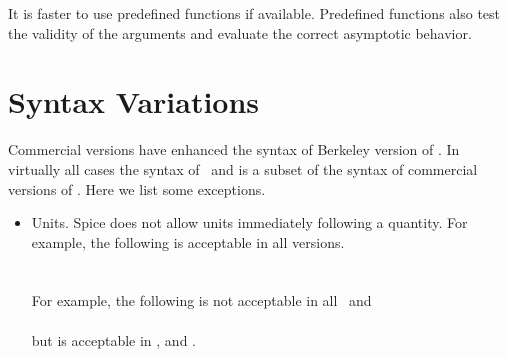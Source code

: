 It is faster to use predefined functions if available. Predefined
functions also test the validity of the arguments and evaluate the correct
asymptotic behavior.

\section{Syntax Variations}
Commercial versions have enhanced the syntax of Berkeley version of
\justspice .  In virtually all cases the syntax of \spicetwo\ and
\spicethree is a subset of the syntax of commercial versions of \justspice .
Here we list some exceptions.
\begin{itemize}
\item Units.  Spice does not allow units immediately following a quantity.
      For example, the following is acceptable in all versions.\\
      \\
      \\
      For example, the following is not acceptable in all \spicetwo\ and
      \spicethree\\
      \\
      but is acceptable in \hspice , \pspice  and \sspice.
\end{itemize}